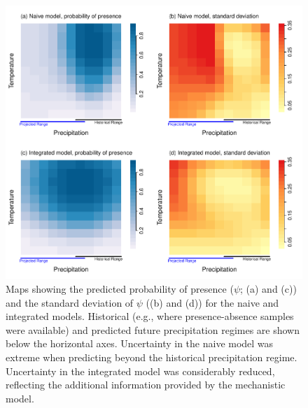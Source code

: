 \begin{figure}[tb]
	\includegraphics[width=5.25in]{ex1_map.pdf}
	\caption{Maps showing the predicted probability of presence (\(\psi\); (a) and (c)) and the standard deviation of \(\psi\) ((b) and (d)) for the naive and integrated models.
	Historical (e.g., where presence-absence samples were available) and predicted future precipitation regimes are shown below the horizontal axes.
	Uncertainty in the naive model was extreme when predicting beyond the historical precipitation regime.
	Uncertainty in the integrated model was considerably reduced, reflecting the additional information provided by the mechanistic model.}
	\label{fig:ex1_map}
\end{figure}
%


